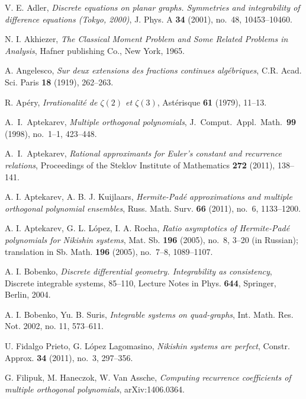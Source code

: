 \documentclass{amsart}
\theoremstyle{remark}
\numberwithin{equation}{section}
\begin{document}
\begin{thebibliography}{99}

V. E. Adler, 
\textit{Discrete equations on planar graphs. Symmetries and integrability of difference equations (Tokyo, 2000)},
J. Phys. A \textbf{34} (2001), no.~48, 10453--10460.

N. I. Akhiezer, 
\textit{The Classical Moment Problem and Some Related Problems in Analysis},
Hafner publishing Co., New York, 1965.

A. Angelesco, 
\textit{Sur deux extensions des fractions continues alg\'ebriques}, 
C.R. Acad. Sci. Paris \textbf{18} (1919), 262--263.

R. Ap\'ery, 
\textit{Irrationalit\'e de $\zeta(2)$ et $\zeta(3)$}, 
Ast\'erisque \textbf{61} (1979), 11--13.

A.~I.~Aptekarev,
\textit{Multiple orthogonal polynomials},
J.\ Comput.\ Appl.\ Math.\ \textbf{99} (1998), no.~1--1, 423--448.

A.~I.~Aptekarev,
\textit{Rational approximants for Euler's constant and recurrence relations},
Proceedings of the Steklov Institute of Mathematics \textbf{272}  (2011), 138--141.

A. I. Aptekarev, A. B. J.  Kuijlaars, 
\textit{Hermite-Pad\'e approximations and multiple orthogonal polynomial ensembles},  
Russ. Math. Surv. \textbf{66} (2011), no.~6, 1133--1200.

A. I. Aptekarev, G. L. L\'opez, I. A. Rocha, 
\textit{Ratio asymptotics of Hermite-Pad\'e polynomials for Nikishin systems}, 
Mat. Sb.  \textbf{196}  (2005),  no.~8, 3--20 (in Russian);  translation in  Sb. Math.  \textbf{196}  (2005),  no.~7--8, 1089--1107. 

A. I. Bobenko, 
\textit{Discrete differential geometry. Integrability as consistency}, 
Discrete integrable systems, 85--110, Lecture Notes in Phys. \textbf{644}, Springer, Berlin, 2004.

A. I. Bobenko, Yu. B. Suris, 
\textit{Integrable systems on quad-graphs}, 
Int. Math. Res. Not. 2002, no. 11, 573--611.

U. Fidalgo Prieto, G. L\'opez Lagomasino, 
\textit{Nikishin systems are perfect}, 
Constr. Approx. \textbf{34} (2011), no.~3, 297--356.

G. Filipuk, M. Haneczok, W. Van Assche, 
\textit{Computing recurrence coefficients of multiple orthogonal polynomials},
arXiv:1406.0364.


\end{thebibliography}
\end{document}
